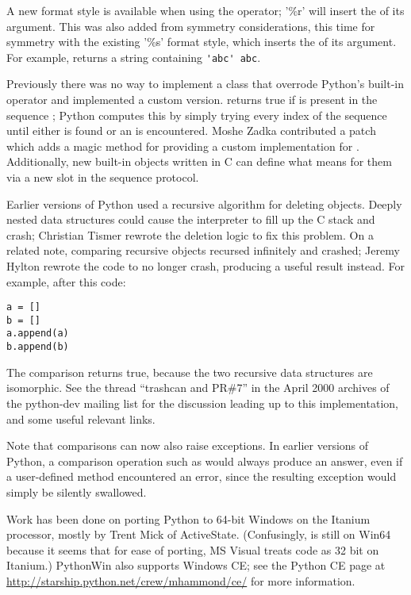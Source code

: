 \documentclass{howto}
\begin{document}
A new format style is available when using the \code{\%} operator;
'\%r' will insert the  of its argument.  This was
also added from symmetry considerations, this time for symmetry with
the existing '\%s' format style, which inserts the  of
its argument.  For example,  returns a
string containing \verb|'abc' abc|.

Previously there was no way to implement a class that overrode
Python's built-in  operator and implemented a custom
version.   returns true if  is
present in the sequence ; Python computes this by simply
trying every index of the sequence until either  is found or
an  is encountered.  Moshe Zadka contributed a
patch which adds a  magic method for providing a
custom implementation for . Additionally, new built-in
objects written in C can define what  means for them via a
new slot in the sequence protocol.

Earlier versions of Python used a recursive algorithm for deleting
objects.  Deeply nested data structures could cause the interpreter to
fill up the C stack and crash; Christian Tismer rewrote the deletion
logic to fix this problem.  On a related note, comparing recursive
objects recursed infinitely and crashed; Jeremy Hylton rewrote the
code to no longer crash, producing a useful result instead.  For
example, after this code:

\begin{verbatim}
a = []
b = []
a.append(a)
b.append(b)
\end{verbatim}

The comparison  returns true, because the two recursive
data structures are isomorphic. See the thread ``trashcan
and PR\#7'' in the April 2000 archives of the python-dev mailing list
for the discussion leading up to this implementation, and some useful
relevant links.  

Note that comparisons can now also raise exceptions. In earlier
versions of Python, a comparison operation such as 
would always produce an answer, even if a user-defined
 method encountered an error, since the resulting
exception would simply be silently swallowed.

Work has been done on porting Python to 64-bit Windows on the Itanium
processor, mostly by Trent Mick of ActiveState.  (Confusingly,
 is still  on Win64 because it seems
that for ease of porting, MS Visual \Cpp{} treats code as 32 bit on Itanium.)
PythonWin also supports Windows CE; see the Python CE page at
\url{http://starship.python.net/crew/mhammond/ce/} for more
information.
\end{document}
